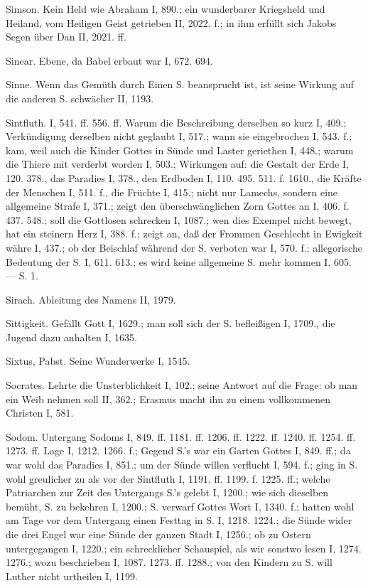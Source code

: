 Simson. Kein Held wie Abraham I, 890.; ein wunderbarer Kriegsheld und Heiland, vom Heiligen Geist getrieben II, 2022. f.; in ihm erfüllt sich Jakobs Segen über Dan II, 2021. ff.

Sinear. Ebene, da Babel erbaut war I, 672. 694.

Sinne. Wenn das Gemüth durch Einen S. beansprucht ist, ist seine Wirkung auf die anderen S. schwächer II, 1193.

Sintfluth. I, 541. ff. 556. ff. Warum die Beschreibung derselben so kurz I, 409.; Verkündigung derselben nicht geglaubt I, 517.; wann sie eingebrochen I, 543. f.; kam, weil auch die Kinder Gottes in Sünde und Laster geriethen I, 448.; warum die Thiere mit verderbt worden I, 503.; Wirkungen auf: die Gestalt der Erde I, 120. 378., das Paradies I, 378., den Erdboden I, 110. 495. 511. f. 1610., die Kräfte der Menschen I, 511. f., die Früchte I, 415.; nicht nur Lamechs, sondern eine allgemeine Strafe I, 371.; zeigt den überschwänglichen Zorn Gottes an I, 406. f. 437. 548.; soll die Gottlosen schrecken I, 1087.; wen dies Exempel nicht bewegt, hat ein steinern Herz I, 388. f.; zeigt an, daß der Frommen Geschlecht in Ewigkeit währe I, 437.; ob der Beischlaf während der S. verboten war I, 570. f.; allegorische Bedeutung der S. I, 611. 613.; es wird keine allgemeine S. mehr kommen I, 605. — S.  1.

Sirach. Ableitung des Namens II, 1979.

Sittigkeit. Gefällt Gott I, 1629.; man soll sich der S. befleißigen I, 1709., die Jugend dazu anhalten I, 1635.

Sixtus, Pabst. Seine Wunderwerke I, 1545.

Socrates. Lehrte die Unsterblichkeit I, 102.; seine Antwort auf die Frage: ob man ein Weib nehmen soll II, 362.; Erasmus macht ihn zu einem vollkommenen Christen I, 581.

Sodom. Untergang Sodoms I, 849. ff. 1181. ff. 1206. ff. 1222. ff. 1240. ff. 1254. ff. 1273. ff. Lage I, 1212. 1266. f.; Gegend S.’s war ein Garten Gottes I, 849. ff.; da war wohl das Paradies I, 851.; um der Sünde willen verflucht I, 594. f.; ging in S. wohl greulicher zu als vor der Sintfluth I, 1191. ff. 1199. f. 1225. ff.; welche Patriarchen zur Zeit des Untergangs S.’s gelebt I, 1200.; wie sich dieselben bemüht, S. zu bekehren I, 1200.; S. verwarf Gottes Wort I, 1340. f.; hatten wohl am Tage vor dem Untergang einen Festtag in S. I, 1218. 1224.; die Sünde wider die drei Engel war eine Sünde der ganzen Stadt I, 1256.; ob zu Ostern untergegangen I, 1220.; ein schrecklicher Schauspiel, als wir sonstwo lesen I, 1274. 1276.; wozu beschrieben I, 1087. 1273. ff. 1288.; von den Kindern zu S. will Luther nicht urtheilen I, 1199.


